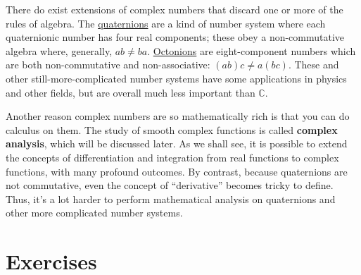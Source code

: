 \documentclass[10pt,a4paper]{article}
\begin{document}
There do exist extensions of complex numbers that discard one or more of
the rules of algebra. The
\href{https://en.wikipedia.org/wiki/Quaternion}{quaternions} are a kind
of number system where each quaternionic number has four real
components; these obey a non-commutative algebra where, generally,
$ab \ne ba$. \href{https://en.wikipedia.org/wiki/Octonion}{Octonions}
are eight-component numbers which are both non-commutative and
non-associative: $(ab)c \ne a(bc)$. These and other
still-more-complicated number systems have some applications in physics
and other fields, but are overall much less important than
$\mathbb{C}$.

Another reason complex numbers are so mathematically rich is that you
can do calculus on them. The study of smooth complex functions is
called \textbf{complex analysis}, which will be discussed later. As we
shall see, it is possible to extend the concepts of differentiation
and integration from real functions to complex functions, with many
profound outcomes. By contrast, because quaternions are not
commutative, even the concept of ``derivative'' becomes tricky to
define. Thus, it's a lot harder to perform mathematical analysis on
quaternions and other more complicated number systems.

\section{Exercises}
\end{document}
